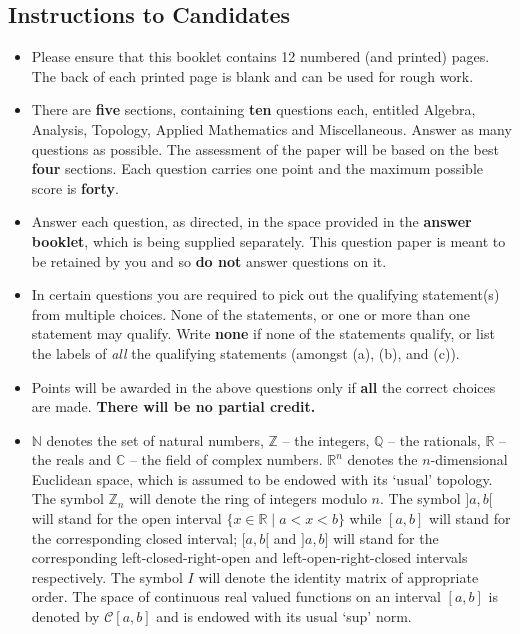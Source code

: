 \documentclass[11pt,a4paper]{article}
\newcommand{\N}{\mathbb{N}}
\newcommand{\Z}{\mathbb{Z}}
\newcommand{\Q}{\mathbb{Q}}
\newcommand{\R}{\mathbb{R}}
\newcommand{\C}{\mathbb{C}}
\begin{document}
\subsection*{Instructions to Candidates}
\begin{itemize}
  \item Please ensure that this booklet contains 12 numbered (and printed) pages. The back of each printed page is blank and can be used for rough work.
  \item There are \textbf{five} sections, containing \textbf{ten} questions each, entitled Algebra, Analysis, Topology, Applied Mathematics and Miscellaneous. Answer as many questions as possible. The assessment of the paper will be based on the best \textbf{four} sections. Each question carries one point and the maximum possible score is \textbf{forty}.
  \item Answer each question, as directed, in the space provided in the \textbf{answer booklet}, which is being supplied separately. This question paper is meant to be retained by you and so \textbf{do not} answer questions on it.
  \item In certain questions you are required to pick out the qualifying statement(s) from multiple choices. None of the statements, or one or more than one statement may qualify. Write \textbf{none} if none of the statements qualify, or list the labels of \emph{all} the qualifying statements (amongst (a), (b), and (c)).
  \item Points will be awarded in the above questions only if \textbf{all} the correct choices are made. \textbf{There will be no partial credit.}
  \item $\N$ denotes the set of natural numbers, $\Z$ -- the integers, $\Q$ -- the rationals, $\R$ -- the reals and $\C$ -- the field of complex numbers. $\R^n$ denotes the $n$-dimensional Euclidean space, which is assumed to be endowed with its `usual' topology. The symbol $\Z_n$ will denote the ring of integers modulo $n$. The symbol $]a, b[$ will stand for the open interval $\{x \in \R \mid a < x < b\}$ while $[a, b]$ will stand for the corresponding closed interval; $[a, b[$ and $]a, b]$ will stand for the corresponding left-closed-right-open and left-open-right-closed intervals respectively. The symbol $I$ will denote the identity matrix of appropriate order. The space of continuous real valued functions on an interval $[a, b]$ is denoted by $\mathcal{C}[a, b]$ and is endowed with its usual `sup' norm.
\end{itemize}
\end{document}
